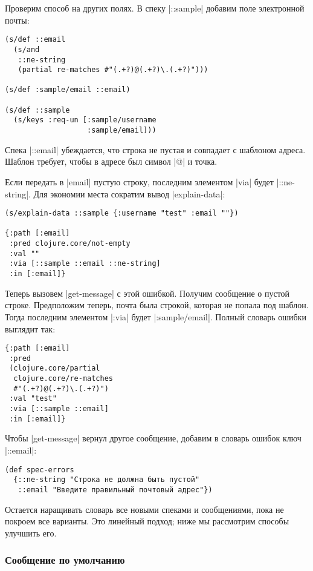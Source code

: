 Проверим способ на других полях. В спеку \spverb|::sample| добавим поле
электронной почты:

\begin{verbatim}
(s/def ::email
  (s/and
   ::ne-string
   (partial re-matches #"(.+?)@(.+?)\.(.+?)")))

(s/def :sample/email ::email)

(s/def ::sample
  (s/keys :req-un [:sample/username
                   :sample/email]))
\end{verbatim}

Спека \spverb|::email| убеждается, что строка не пустая и совпадает с шаблоном
адреса. Шаблон требует, чтобы в адресе был символ \spverb|@| и точка.

Если передать в \spverb|email| пустую строку, последним элементом \spverb|via|
будет \spverb|::ne-string|. Для экономии места сократим вывод
\spverb|explain-data|:

\begin{verbatim}
(s/explain-data ::sample {:username "test" :email ""})

{:path [:email]
 :pred clojure.core/not-empty
 :val ""
 :via [::sample ::email ::ne-string]
 :in [:email]}
\end{verbatim}

Теперь вызовем \spverb|get-message| с этой ошибкой. Получим сообщение о пустой
строке. Предположим теперь, почта была строкой, которая не попала под
шаблон. Тогда последним элементом \spverb|:via| будет
\spverb|:sample/email|. Полный словарь ошибки выглядит так:

\begin{verbatim}
{:path [:email]
 :pred
 (clojure.core/partial
  clojure.core/re-matches
  #"(.+?)@(.+?)\.(.+?)")
 :val "test"
 :via [::sample ::email]
 :in [:email]}
\end{verbatim}

Чтобы \spverb|get-message| вернул другое сообщение, добавим в словарь ошибок
ключ \spverb|::email|:

\begin{verbatim}
(def spec-errors
  {::ne-string "Строка не должна быть пустой"
   ::email "Введите правильный почтовый адрес"})
\end{verbatim}

Остается наращивать словарь все новыми спеками и сообщениями, пока не покроем
все варианты. Это линейный подход; ниже мы рассмотрим способы улучшить его.

\subsubsection{Сообщение по умолчанию}

